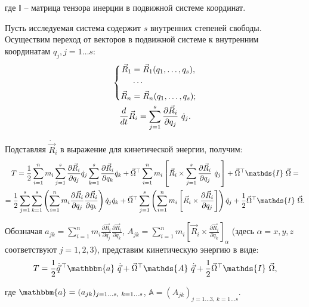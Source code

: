 \documentclass[12pt]{article}
\newcommand{\bbA}{\mathds{A}}
\newcommand{\bbI}{\mathds{I}}
\newcommand{\bba}{\mathbbm{a}}
\newcommand{\vlevo}{\hspace*{-0.63cm}}
\newcommand{\vverh}{\vspace*{-0.1cm}}
\begin{document}
\vlevo где $\bbI$ -- матрица тензора инерции в подвижной системе координат.

Пусть исследуемая система содержит $s$ внутренних степеней свободы. Осуществим переход от векторов в подвижной системе к внутренним координатам $q_j, j=1 \dots s$:
\vverh
\begin{gather}
\left\{
\begin{aligned}
\vec{R}_1 &= \vec{R}_1 (q_1, \dots, q_s), \\
&\cdots \\
\vec{R}_n &= \vec{R}_n (q_1, \dots, q_s);
\end{aligned}
\right. \notag \\
\frac{d}{dt} \vec{R}_i = \sum_{j=1}^{s} \frac{\partial \vec{R}_i}{\partial q_j} \ \dot{q}_j \notag .
\end{gather}

Подставляя $\dot{\vec{R}}_i$ в выражение для кинетической энергии, получим:
\vverh
\begin{gather}
T = \frac{1}{2} \sum_{i=1}^{n} m_i \sum_{j=1}^{s} \frac{\partial \vec{R}_i}{\partial q_j} \dot{q}_j \sum_{k=1}^{s} \frac{\partial \vec{R}_i}{\partial q_k} \dot{q}_k + \vec{\Omega}^\top \sum_{i=1}^{n} m_i \left[ \vec{R}_i \times \sum_{j=1}^{s} \frac{\partial \vec{R}_i}{\partial q_j} \ \dot{q}_j \right] + \vec{\Omega}^\top \bbI \ \vec{\Omega} = \notag \\
= \frac{1}{2} \sum_{j=1}^{s} \sum_{k=1}^{s} \left( \sum_{i=1}^{n} m_i \frac{\partial \vec{R}_i}{\partial q_j} \frac{\partial \vec{R}_i}{\partial q_k} \right) \dot{q}_j \dot{q}_k + \vec{\Omega}^\top \sum_{j=1}^{s} \left( \sum_{i=1}^{n} m_i \left[ \vec{R}_i \times \frac{\partial \vec{R}_i}{\partial q_j} \right] \right) \dot{q}_j + \frac{1}{2} \vec{\Omega}^\top \bbI \ \vec{\Omega} \notag .
\end{gather}

Обозначая $a_{jk} = \sum_{i=1}^{n} m_i \frac{\partial \vec{R}_i}{\partial q_j} \frac{\partial \vec{R}_i}{\partial q_k}$, $A_{jk} = \sum_{i=1}^{n} m_i \left[ \vec{R}_i \times \frac{\partial \vec{R}_i}{\partial q_k} \right]_{\alpha}$ (здесь $\alpha = x,y,z$ соответствуют $j=1,2,3$), представим кинетическую энергию в виде:
\vverh
\begin{gather}
T = \frac{1}{2} \dot{\vec{q}}^{\, \top} \bba \ \dot{\vec{q}} + \vec{\Omega}^\top \bbA \ \dot{\vec{q}} + \frac{1}{2} \vec{\Omega}^\top \bbI \ \vec{\Omega} \notag ,
\end{gather}

\vlevo где $\bba = (a_{jk})_{j=1 \dots s, \ k=1 \dots s}$, $\bbA = (A_{jk})_{j=1 \dots 3, \ k=1 \dots s}$.
\end{document}
